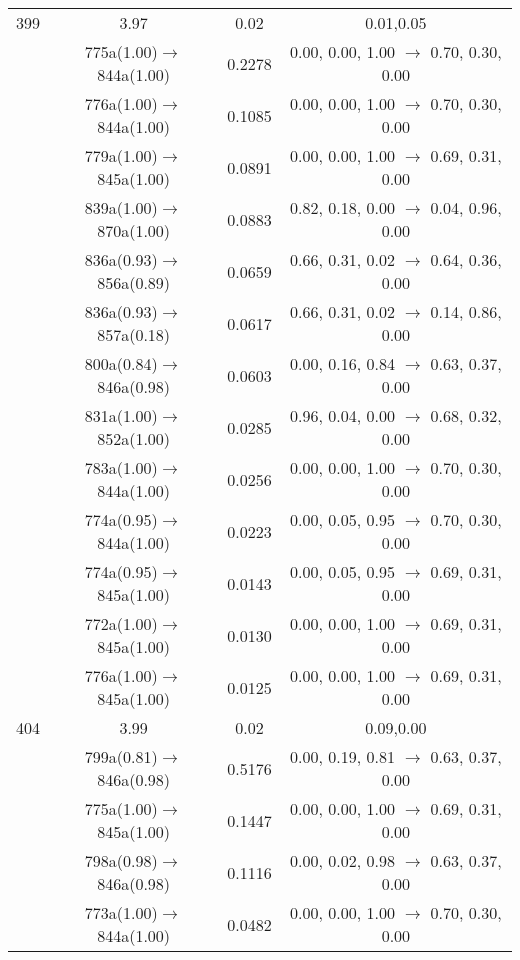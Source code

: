 \documentclass[10pt,a4paper]{article}
\begin{document}
\begin{longtable}{c|c|c|c}
 \hline399 &	 3.97 &	 0.02 &	 0.01,0.05 \\ 
  	& 775a(1.00)$\rightarrow$844a(1.00) &	 0.2278 &	 0.00, 0.00, 1.00 $\rightarrow$ 0.70, 0.30, 0.00 \\ 
 	& 776a(1.00)$\rightarrow$844a(1.00) &	 0.1085 &	 0.00, 0.00, 1.00 $\rightarrow$ 0.70, 0.30, 0.00 \\ 
 	& 779a(1.00)$\rightarrow$845a(1.00) &	 0.0891 &	 0.00, 0.00, 1.00 $\rightarrow$ 0.69, 0.31, 0.00 \\ 
 	& 839a(1.00)$\rightarrow$870a(1.00) &	 0.0883 &	 0.82, 0.18, 0.00 $\rightarrow$ 0.04, 0.96, 0.00 \\ 
 	& 836a(0.93)$\rightarrow$856a(0.89) &	 0.0659 &	 0.66, 0.31, 0.02 $\rightarrow$ 0.64, 0.36, 0.00 \\ 
 	& 836a(0.93)$\rightarrow$857a(0.18) &	 0.0617 &	 0.66, 0.31, 0.02 $\rightarrow$ 0.14, 0.86, 0.00 \\ 
 	& 800a(0.84)$\rightarrow$846a(0.98) &	 0.0603 &	 0.00, 0.16, 0.84 $\rightarrow$ 0.63, 0.37, 0.00 \\ 
 	& 831a(1.00)$\rightarrow$852a(1.00) &	 0.0285 &	 0.96, 0.04, 0.00 $\rightarrow$ 0.68, 0.32, 0.00 \\ 
 	& 783a(1.00)$\rightarrow$844a(1.00) &	 0.0256 &	 0.00, 0.00, 1.00 $\rightarrow$ 0.70, 0.30, 0.00 \\ 
 	& 774a(0.95)$\rightarrow$844a(1.00) &	 0.0223 &	 0.00, 0.05, 0.95 $\rightarrow$ 0.70, 0.30, 0.00 \\ 
 	& 774a(0.95)$\rightarrow$845a(1.00) &	 0.0143 &	 0.00, 0.05, 0.95 $\rightarrow$ 0.69, 0.31, 0.00 \\ 
 	& 772a(1.00)$\rightarrow$845a(1.00) &	 0.0130 &	 0.00, 0.00, 1.00 $\rightarrow$ 0.69, 0.31, 0.00 \\ 
 	& 776a(1.00)$\rightarrow$845a(1.00) &	 0.0125 &	 0.00, 0.00, 1.00 $\rightarrow$ 0.69, 0.31, 0.00 \\ 
 \hline404 &	 3.99 &	 0.02 &	 0.09,0.00 \\ 
  	& 799a(0.81)$\rightarrow$846a(0.98) &	 0.5176 &	 0.00, 0.19, 0.81 $\rightarrow$ 0.63, 0.37, 0.00 \\ 
 	& 775a(1.00)$\rightarrow$845a(1.00) &	 0.1447 &	 0.00, 0.00, 1.00 $\rightarrow$ 0.69, 0.31, 0.00 \\ 
 	& 798a(0.98)$\rightarrow$846a(0.98) &	 0.1116 &	 0.00, 0.02, 0.98 $\rightarrow$ 0.63, 0.37, 0.00 \\ 
 	& 773a(1.00)$\rightarrow$844a(1.00) &	 0.0482 &	 0.00, 0.00, 1.00 $\rightarrow$ 0.70, 0.30, 0.00 \\ 

\end{longtable}
\end{document}
